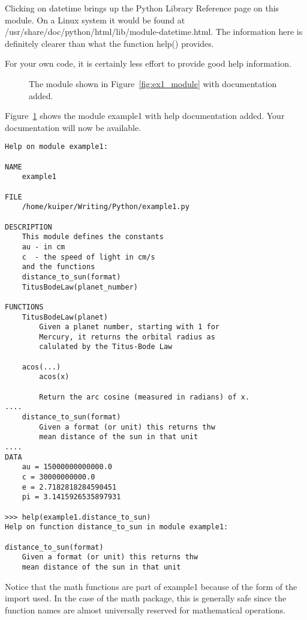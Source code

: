 \documentclass{article}
\begin{document}
Clicking on {\ttfamily datetime} brings up the Python Library Reference page on
this module. On a Linux system it would be found at\newline
{\ttfamily /usr/share/doc/python/html/lib/module-datetime.html}. The information
here is definitely clearer than what the function {\ttfamily help()}
provides.

For your own code, it is certainly less effort to provide good help information.
\begin{figure}[h!tb]
\begin{center}
\caption{\label{fig:ex1help}The module shown in Figure~\ref{fig:ex1_module}
with documentation added.}
\end{center}
\end{figure}
Figure~\ref{fig:ex1help} shows the module {\ttfamily example1} with
{\ttfamily help} documentation added. Your documentation will now be
available.
\begin{verbatim}
Help on module example1:

NAME
    example1

FILE
    /home/kuiper/Writing/Python/example1.py

DESCRIPTION
    This module defines the constants
    au - in cm
    c  - the speed of light in cm/s
    and the functions
    distance_to_sun(format)
    TitusBodeLaw(planet_number)

FUNCTIONS
    TitusBodeLaw(planet)
        Given a planet number, starting with 1 for
        Mercury, it returns the orbital radius as
        calulated by the Titus-Bode Law

    acos(...)
        acos(x)

        Return the arc cosine (measured in radians) of x.
....
    distance_to_sun(format)
        Given a format (or unit) this returns thw
        mean distance of the sun in that unit
....
DATA
    au = 15000000000000.0
    c = 30000000000.0
    e = 2.7182818284590451
    pi = 3.1415926535897931

>>> help(example1.distance_to_sun)
Help on function distance_to_sun in module example1:

distance_to_sun(format)
    Given a format (or unit) this returns thw
    mean distance of the sun in that unit
\end{verbatim}
Notice that the {\ttfamily math} functions are part of {\ttfamily example1}
because of the form of the {\ttfamily import} used. In the case of the
{\ttfamily math} package, this is generally safe since the function names
are almost universally reserved for mathematical operations.
\end{document}
